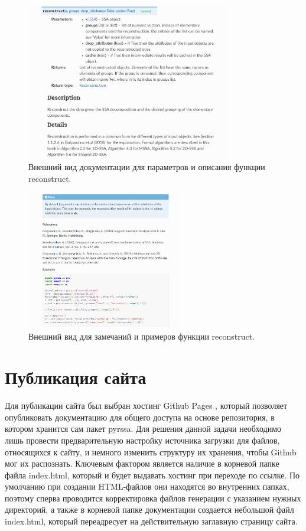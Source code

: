 \documentclass[specialist,
			   substylefile = spbu_report.rtx,
			   subf,href,colorlinks=true, 12pt]{disser}
\begin{document}
\begin{figure}[H]
	\centering
	\includegraphics[width=0.8\textwidth]{rec_par}
	\caption{Внешний вид документации для параметров и описания функции reconstruct.}
	\label{fig:rec_par}
\end{figure}

\begin{figure}[H]
	\centering
	\includegraphics[width=0.6\textwidth]{rec_examples}
	\caption{Внешний вид для замечаний и примеров функции reconstruct.}
	\label{fig:rec_examples}
\end{figure}

\section{Публикация сайта}

Для публикации сайта был выбран хостинг Github Pages \cite{pages-site}, который позволяет опубликовать документацию для общего доступа на основе репозитория, в котором хранится сам пакет pyrssa. Для решения данной задачи необходимо лишь провести предварительную настройку источника загрузки для файлов, относящихся к сайту, и немного изменить структуру их хранения, чтобы Github мог их распознать. Ключевым фактором является наличие в корневой папке файла index.html, который и будет выдавать хостинг при переходе по ссылке. По умолчанию при создании HTML-файлов они находятся во внутренних папках, поэтому сперва проводится корректировка файлов генерации с указанием нужных директорий, а также в корневой папке документации создается небольшой файл index.html, который переадресует на действительную заглавную страницу сайта.
\end{document}
